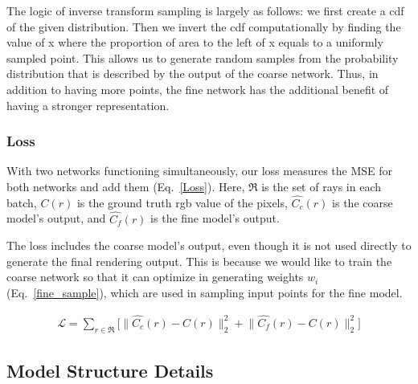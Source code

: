 The logic of inverse transform sampling is largely as follows: we first create a cdf of the given distribution. Then we invert the cdf computationally by finding the value of x where the proportion of area to the left of x equals to a uniformly sampled point. This allows us to generate random samples from the probability distribution that is described by the output of the coarse network. Thus, in addition to having more points, the fine network has the additional benefit of having a stronger representation.

\subsubsection{Loss}

With two networks functioning simultaneously, our loss measures the MSE for both networks and add them (Eq.~\ref{Loss}). Here, $\mathfrak{R}$ is the set of rays in each batch, $C(r)$ is the ground truth rgb value of the pixels, $\hat{C_c}(r)$ is the coarse model's output, and $\hat{C_f}(r)$ is the fine model's output.

The loss includes the coarse model's output, even though it is not used directly to generate the final rendering output. This is because we would like to train the coarse network so that it can optimize in generating weights $w_i$ (Eq.~\ref{fine_sample}), which are used in sampling input points for the fine model.

\begin{equation}
\begin{aligned}
\mathcal{L} = \sum_{r \in \mathfrak{R}}  \biggr[\big\| \hat{C_c}(r) - C(r) \big\|_{2}^{2} + \big\| \hat{C_f}(r) - C(r) \big\|_{2}^{2} \biggr]
\end{aligned}
\label{Loss}
\end{equation}


\subsection{Model Structure Details}

